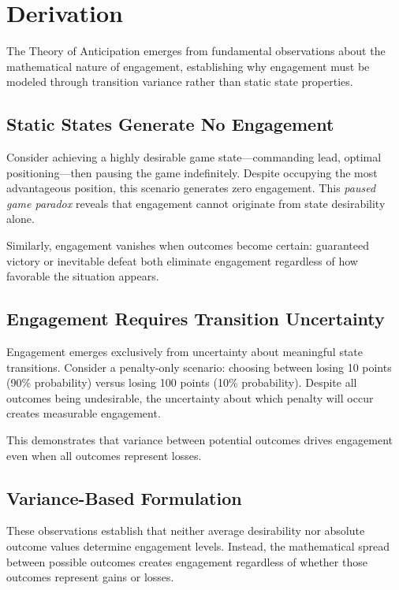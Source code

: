 \documentclass{article}
\begin{document}
\section{Derivation}

The Theory of Anticipation emerges from fundamental observations about the mathematical nature of engagement, establishing why engagement must be modeled through transition variance rather than static state properties.

\subsection{Static States Generate No Engagement}

Consider achieving a highly desirable game state—commanding lead, optimal positioning—then pausing the game indefinitely. Despite occupying the most advantageous position, this scenario generates zero engagement. This \emph{paused game paradox} reveals that engagement cannot originate from state desirability alone.

Similarly, engagement vanishes when outcomes become certain: guaranteed victory or inevitable defeat both eliminate engagement regardless of how favorable the situation appears.

\subsection{Engagement Requires Transition Uncertainty}

Engagement emerges exclusively from uncertainty about meaningful state transitions. Consider a penalty-only scenario: choosing between losing 10 points (90\% probability) versus losing 100 points (10\% probability). Despite all outcomes being undesirable, the uncertainty about which penalty will occur creates measurable engagement.

This demonstrates that variance between potential outcomes drives engagement even when all outcomes represent losses.

\subsection{Variance-Based Formulation}

These observations establish that neither average desirability nor absolute outcome values determine engagement levels. Instead, the mathematical spread between possible outcomes creates engagement regardless of whether those outcomes represent gains or losses.
\end{document}
